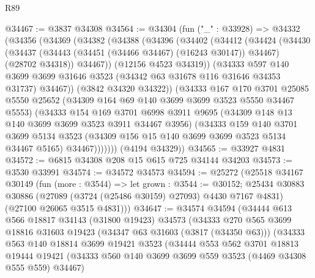 \begin{lexlean}{R89}
\begin{coremodule}
@34467 := @3837 @34308
@34564 := @34304
    (fun ("_" : @33928) =>
    @34332
      (@34356
        (@34369
          (@34382
            (@34388
              (@34396
                (@34402
                  (@34412
                    (@34424
                      (@34430
                        (@34437
                          (@34443 (@34451 (@34466 @34467) (@16243 @30147)) @34467)
                          (@28702 @34318))
                        @34467))
                    (@12156 @4523 @34319))
                  (@34333
                    @597
                    @140
                    @3699
                    @3699
                    @31646
                    @3523
                    (@34342 @63 @31678 @116 @31646 @34353 @31737)
                    @34467))
                (@3842 @34320 @34322))
              (@34333
                @167
                @170
                @3701
                @25085
                @5550
                @25652
                (@34309 @164 @69 @140 @3699 @3699 @3523 @5550 @34467 @5553)
                (@34333
                  @154
                  @169
                  @3701
                  @6998
                  @3911
                  @9695
                  (@34309 @148 @13 @140 @3699 @3699 @3523 @3911 @34467 @3956)
                  (@34333
                    @159
                    @140
                    @3701
                    @3699
                    @5134
                    @3523
                    (@34309 @156 @15 @140 @3699 @3699 @3523 @5134 @34467 @5165)
                    @34467)))))))
      (@4194 @34329))
@34565 := @33927 @4831
@34572 := @6815 @34308 @208 @15 @615 @725 @34144 @34203
@34573 := @3530 @33991
@34574 := @34572 @34573
@34594 := @25272
    (@25518
      @34167
      @30149
      (fun (more : @3544) =>
      let grown : @3544 := @30152;
      @25434
        @30883
        @30886
        (@27089 (@3724 (@25486 @30159) @27093) @4430 @7167 @4831)
        (@27100 @26065 @3515 @4831)))
@34647 := @34574
    @34594
    (@34444
      @613
      @566
      @18817
      @34143
      (@31800 @19423)
      @34573
      (@34333
        @270
        @565
        @3699
        @18816
        @31603
        @19423
        (@34347 @63 @31603 (@3817 (@34350 @63)))
        (@34333
          @563
          @140
          @18814
          @3699
          @19421
          @3523
          (@34444
            @553
            @562
            @3701
            @18813
            @19444
            @19421
            (@34333 @560 @140 @3699 @3699 @559 @3523 (@4469 @34308 @555 @559) @34467)

\end{coremodule}
\end{lexlean}
